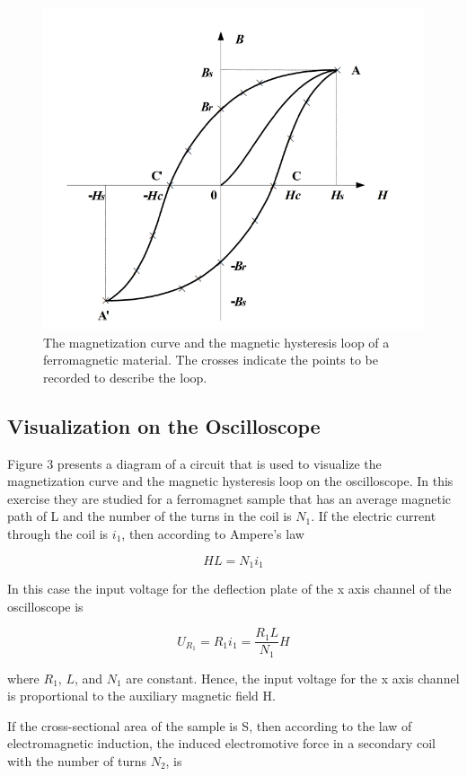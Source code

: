 \documentclass{article}
\begin{document}
\begin{figure}[H]
	\centering
	\includegraphics[scale=0.6]{fig2.png}
	\caption{The magnetization curve and the magnetic hysteresis loop of a ferromagnetic material. The crosses indicate the points to be recorded to describe the loop.}
\end{figure}


\subsection{Visualization on the Oscilloscope}

Figure 3 presents a diagram of a circuit that is used to visualize the magnetization
curve and the magnetic hysteresis loop on the oscilloscope. In this exercise they are
studied for a ferromagnet sample that has an average magnetic path of L and the number
of the turns in the coil is $N_1$. If the electric current through the coil is $i_1$, then according
to Ampere's law

$$HL=N_1i_1$$

In this case the input voltage for the deflection plate of the x axis channel of the oscilloscope is

$$U_{R_1}=R_1i_1=\frac{R_1L}{N_1}H$$

where $R_1$, $L$, and $N_1$ are constant. Hence, the input voltage for the x axis channel is
proportional to the auxiliary magnetic field H.

If the cross-sectional area of the sample is S, then according to the law of electromagnetic induction, the induced electromotive force in a secondary coil with the number of turns $N_2$, is
\end{document}
